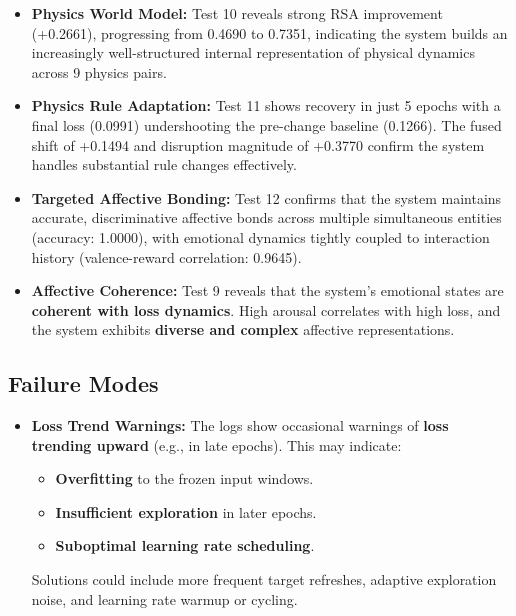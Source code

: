 \documentclass[12pt]{article}
\begin{document}
\begin{itemize}
    \item \textbf{Physics World Model:}
    Test 10 reveals strong RSA improvement (+0.2661), progressing from
    0.4690 to 0.7351, indicating the system builds an increasingly
    well-structured internal representation of physical dynamics
    across 9 physics pairs.

    \item \textbf{Physics Rule Adaptation:}
    Test 11 shows recovery in just 5 epochs with a final loss
    (0.0991) undershooting the pre-change baseline (0.1266). The
    fused shift of +0.1494 and disruption magnitude of +0.3770
    confirm the system handles substantial rule changes effectively.

    \item \textbf{Targeted Affective Bonding:}
    Test 12 confirms that the system maintains accurate, discriminative
    affective bonds across multiple simultaneous entities (accuracy:
    1.0000), with emotional dynamics tightly coupled to interaction
    history (valence-reward correlation: 0.9645).

    \item \textbf{Affective Coherence:}
    Test 9 reveals that the system's emotional states are
    \textbf{coherent with loss dynamics}. High arousal correlates with
    high loss, and the system exhibits \textbf{diverse and complex}
    affective representations.
\end{itemize}

\subsection{Failure Modes}
\label{subsec:failures}

\begin{itemize}
    \item \textbf{Loss Trend Warnings:}
    The logs show occasional warnings of \textbf{loss trending upward}
    (e.g., in late epochs). This may indicate:
    \begin{itemize}
        \item \textbf{Overfitting} to the frozen input windows.
        \item \textbf{Insufficient exploration} in later epochs.
        \item \textbf{Suboptimal learning rate scheduling}.
    \end{itemize}
    Solutions could include more frequent target refreshes, adaptive
    exploration noise, and learning rate warmup or cycling.
\end{itemize}
\end{document}
